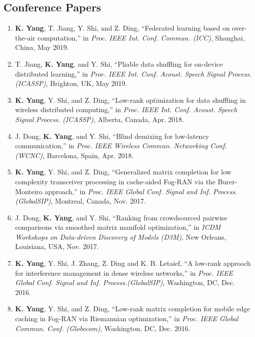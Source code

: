 \documentclass{article}
\begin{document}
\subsection*{Conference Papers}

\begin{enumerate}
\item \textbf{K. Yang}, T. Jiang, Y. Shi, and Z. Ding, ``Federated learning based on over-the-air computation,'' in \textit{Proc. IEEE Int. Conf. Commun. (ICC)}, Shanghai, China, May 2019.
\item T. Jiang, \textbf{K. Yang}, and Y. Shi, ``Pliable data shuffling for on-device distributed learning,'' in \textit{Proc. IEEE Int. Conf. Acoust. Speech Signal Process. (ICASSP)}, Brighton, UK, May 2019.

\item \textbf{K. Yang}, Y. Shi, and Z. Ding, ``Low-rank optimization for data shuffling in wireless distributed computing,'' in \textit{Proc. IEEE Int. Conf. Acoust. Speech Signal Process. (ICASSP)}, Alberta, Canada,
        Apr. 2018.
        \item J. Dong, \textbf{K. Yang}, and Y. Shi, ``Blind demixing for low-latency communication,'' in \textit{Proc. IEEE Wireless Commun. Networking Conf. (WCNC)}, Barcelona, Spain, Apr. 2018.
        \item \textbf{K. Yang}, Y. Shi, and Z. Ding, ``Generalized matrix completion for low complexity transceiver processing in cache-aided Fog-RAN via the Burer-Monteiro approach,'' in \textit{Proc. IEEE Global Conf. Signal and Inf. Process. (GlobalSIP)}, Montreal, Canada, Nov. 2017.
        \item J. Dong, \textbf{K. Yang}, and Y. Shi, ``Ranking from crowdsourced pairwise comparisons via smoothed matrix manifold optimization,'' in \textit{ICDM Workshops on Data-driven Discovery of Models (D3M)}, New Orleans, Louisiana, USA, Nov. 2017.
        \item \textbf{K. Yang}, Y. Shi, J. Zhang, Z. Ding and K. B. Letaief, ``A low-rank approach for interference management in dense wireless networks,'' in \textit{Proc. IEEE Global Conf. Signal and Inf. Process.(GlobalSIP)}, Washington, DC, Dec. 2016.
        \item \textbf{K. Yang}, Y. Shi, and Z. Ding, ``Low-rank matrix completion for mobile edge caching in Fog-RAN via Riemannian optimization,'' in \textit{Proc. IEEE Global Commun. Conf. (Globecom)}, Washington, DC, Dec. 2016.
        
        
\end{enumerate}
\end{document}
